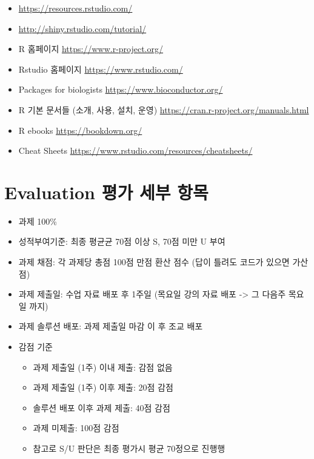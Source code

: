 \documentclass[
]{book}
\providecommand{\tightlist}{%
  \setlength{\itemsep}{0pt}\setlength{\parskip}{0pt}}
\begin{document}
\begin{itemize}
\tightlist
\item
  \url{https://resources.rstudio.com/}
\item
  \url{http://shiny.rstudio.com/tutorial/}
\item
  R 홈페이지 \url{https://www.r-project.org/}
\item
  Rstudio 홈페이지 \url{https://www.rstudio.com/}
\item
  Packages for biologists \url{https://www.bioconductor.org/}
\item
  R 기본 문서들 (소개, 사용, 설치, 운영) \url{https://cran.r-project.org/manuals.html}
\item
  R ebooks \url{https://bookdown.org/}
\item
  Cheat Sheets \url{https://www.rstudio.com/resources/cheatsheets/}
\end{itemize}

\hypertarget{evaluation-uxd3c9uxac00-uxc138uxbd80-uxd56duxbaa9}{%
\section{Evaluation 평가 세부 항목}\label{evaluation-uxd3c9uxac00-uxc138uxbd80-uxd56duxbaa9}}

\begin{itemize}
\item
  과제 100\%
\item
  성적부여기준: 최종 평균균 70점 이상 S, 70점 미만 U 부여
\item
  과제 채점: 각 과제당 총점 100점 만점 환산 점수 (답이 틀려도 코드가 있으면 가산점)
\item
  과제 제출일: 수업 자료 배포 후 1주일 (목요일 강의 자료 배포 -\textgreater{} 그 다음주 목요일 까지)
\item
  과제 솔루션 배포: 과제 제출일 마감 이 후 조교 배포
\item
  감점 기준

  \begin{itemize}
  \tightlist
  \item
    과제 제출일 (1주) 이내 제출: 감점 없음
  \item
    과제 제출일 (1주) 이후 제출: 20점 감점
  \item
    솔루션 배포 이후 과제 제출: 40점 감점\\
  \item
    과제 미제출: 100점 감점
  \item
    참고로 S/U 판단은 최종 평가시 평균 70정으로 진행행
  \end{itemize}
\end{itemize}
\end{document}
